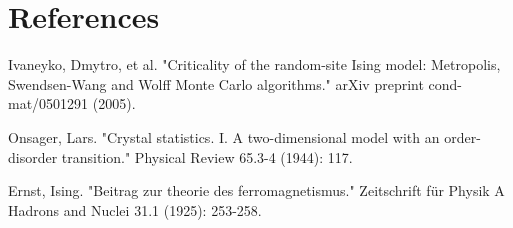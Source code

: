 \documentclass[aps,prl,twocolumn,groupedaddress]{revtex4-2}
\begin{document}
\section*{References}
\begin{thebibliography}{99}
    
     Ivaneyko, Dmytro, et al. "Criticality of the random-site Ising model: Metropolis, Swendsen-Wang and Wolff Monte Carlo algorithms." arXiv preprint cond-mat/0501291 (2005).

     Onsager, Lars. "Crystal statistics. I. A two-dimensional model with an order-disorder transition." Physical Review 65.3-4 (1944): 117.

     Ernst, Ising. "Beitrag zur theorie des ferromagnetismus." Zeitschrift für Physik A Hadrons and Nuclei 31.1 (1925): 253-258.

\end{thebibliography}
\end{document}
